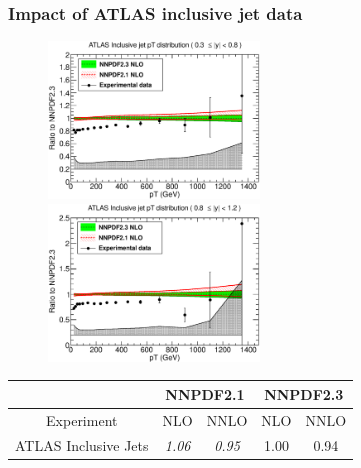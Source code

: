 \documentclass[10pt]{beamer}
\begin{document}
\begin{frame}
\frametitle{Impact of ATLAS inclusive jet data}
 \begin{figure}[b!]
    \begin{center}
      \includegraphics[width=0.50\textwidth]{ATLASR04JETS36PB_1}
      \includegraphics[width=0.50\textwidth]{ATLASR04JETS36PB_2}
    \end{center}
    \vskip-0.5cm
    \label{fig:pdf-jets}
\end{figure}
\begin{table}
\small
\begin{tabular}{|c||c|c||c|c|}
\hline 
& \multicolumn{2}{c||}{\bf NNPDF2.1} & \multicolumn{2}{|c|}{\bf NNPDF2.3}  \\
\hline 
\hline 
Experiment  & NLO & NNLO  & NLO  & NNLO  \\ 
\hline
ATLAS Inclusive Jets  & {\it 1.06} & {\it 0.95}  & 1.00  &  0.94   \\
\hline
\end{tabular}
\end{table}


\end{frame}
\end{document}
